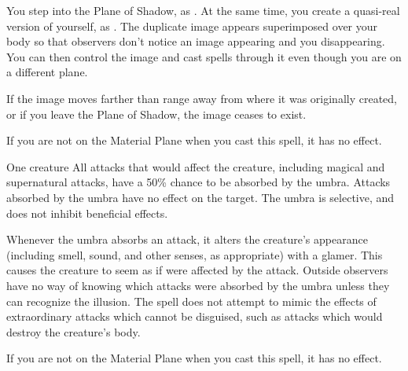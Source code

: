 \begin{spellheader}
    \spelldur{\durmed}
\end{spellheader}
\begin{spelleffects}
    \spelleffect You step into the Plane of Shadow, as . At the same time, you create a quasi-real version of yourself, as . The duplicate image appears superimposed over your body so that observers don't notice an image appearing and you disappearing. You can then control the image and cast spells through it even though you are on a different plane.
\end{spelleffects}
\begin{spellfooter}
    \spellnotes If the image moves farther than \rnglong range away from where it was originally created, or if you leave the Plane of Shadow, the image ceases to exist.

    If you are not on the Material Plane when you cast this spell, it has no effect.
\end{spellfooter}

\begin{spellheader}
    \spellrng{\rngclose}
    \spelldur{\durshort}
\end{spellheader}
\begin{spelleffects}
    \begin{spelltarget}{One creature}
        \spelleffect All attacks that would affect the creature, including magical and supernatural attacks, have a 50\% chance to be absorbed by the umbra. Attacks absorbed by the umbra have no effect on the target. The umbra is selective, and does not inhibit beneficial effects.

        Whenever the umbra absorbs an attack, it alters the creature's appearance (including smell, sound, and other senses, as appropriate) with a glamer. This causes the creature to seem as if were affected by the attack. Outside observers have no way of knowing which attacks were absorbed by the umbra unless they can recognize the illusion. The spell does not attempt to mimic the effects of extraordinary attacks which cannot be disguised, such as attacks which would destroy the creature's body.
    \end{spelltarget}
\end{spelleffects}
\begin{spellfooter}
    \spellnotes If you are not on the Material Plane when you cast this spell, it has no effect.
\end{spellfooter}


